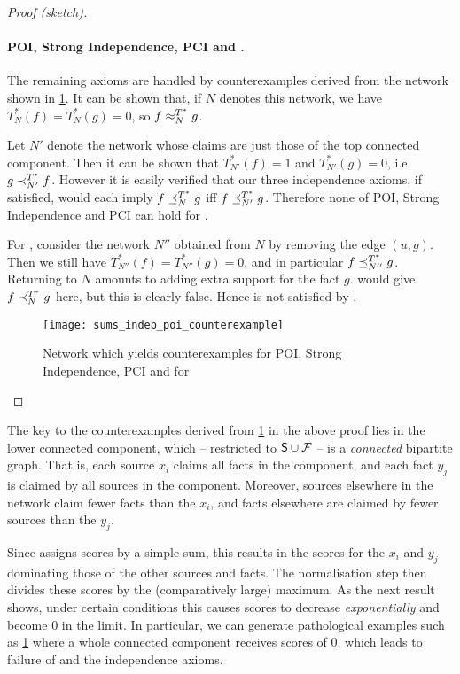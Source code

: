\begin{proof}[Proof (sketch)]
\paragraph{POI, Strong Independence, PCI and \monotonicity{}.}

The remaining axioms are handled by counterexamples derived from the network
shown in \cref{td_fig_sums_indep_poi_counterexample}. It can be shown that, if $N$
denotes this network, we have $T_N^*(f) = T_N^*(g) = 0$, so $f \approx_N^{T^*} g$.

Let $N'$ denote the network whose claims are just those of the top connected
component. Then it can be shown that $T_{N'}^*(f) = 1$ and $T_{N'}^*(g) = 0$,
i.e.  $g \prec_{N'}^{T^*} f$.  However it is easily verified that our three
independence axioms, if satisfied, would each imply $f \preceq_N^{T^*} g$ iff $f
\preceq_{N'}^{T^*} g$. Therefore none of POI, Strong Independence and PCI can
hold for \sums{}.

For \monotonicity{}, consider the network $N''$ obtained from $N$ by removing the
edge $(u, g)$. Then we still have $T_{N''}^*(f) = T_{N''}^*(g) = 0$, and in
particular $f \preceq_{N''}^{T^*} g$. Returning to $N$ amounts to adding extra
support for the fact $g$. \monotonicity{} would give $f \prec_N^{T^*} g$ here, but
this is clearly false. Hence \monotonicity{} is not satisfied by \sums{}.

\begin{figure}[ht]
\centering
\texttt{[image: sums\_indep\_poi\_counterexample]}
\caption{
    Network which yields counterexamples for POI, Strong Independence,
    PCI and \monotonicity{} for \sums{}
}
\label{td_fig_sums_indep_poi_counterexample}
\end{figure}
\end{proof}

The key to the counterexamples derived from
\cref{td_fig_sums_indep_poi_counterexample} in the above proof lies in the lower
connected component, which -- restricted to $\mathsf{S} \cup \mathcal{F}$ -- is a
\emph{connected} bipartite graph. That is, each source $x_i$ claims all facts
in the component, and each fact $y_j$ is claimed by all sources in the
component.  Moreover, sources elsewhere in the network claim fewer facts than
the $x_i$, and facts elsewhere are claimed by fewer sources than the $y_j$.

Since \sums{} assigns scores by a simple sum, this results in the scores for
the $x_i$ and $y_j$ dominating those of the other sources and facts. The
normalisation step then divides these scores by the (comparatively large)
maximum. As the next result shows, under certain conditions this causes scores
to decrease \emph{exponentially} and become 0 in the limit. In particular, we
can generate pathological examples such as
\cref{td_fig_sums_indep_poi_counterexample} where a whole connected component
receives scores of 0, which leads to failure of \monotonicity{} and the
independence axioms.

